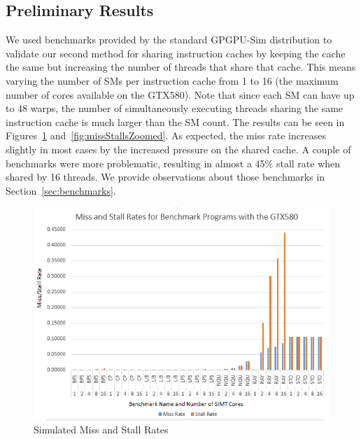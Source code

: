 \subsection{Preliminary Results}

We used benchmarks provided by the standard GPGPU-Sim distribution
to validate our second method for sharing instruction caches by
keeping the cache the same but increasing the number of threads that
share that cache.
This means varying the number of SMs per instruction cache from 1 to
16 (the maximum number of cores available on the GTX580).
Note that since each SM can have up to 48 warps, the number of
simultaneously executing threads sharing the same instruction cache is
much larger than the SM count.
The results can be seen in Figures~\ref{fig:missStalls}
and~\ref{fig:missStallsZoomed}. 
As expected, the miss rate increases slightly in most cases by the
increased pressure on the shared cache.
A couple of benchmarks were more problematic, resulting in
almost a 45\% stall rate when shared by 16 threads.
We provide observations about those benchmarks in
Section~\ref{sec:benchmarks}.

\begin{figure}
\centering
\includegraphics[width=\columnwidth]{graphics/miss_stalls_benchmarks.png}
\caption{Simulated Miss and Stall Rates }
\label{fig:missStalls}
\end{figure}

